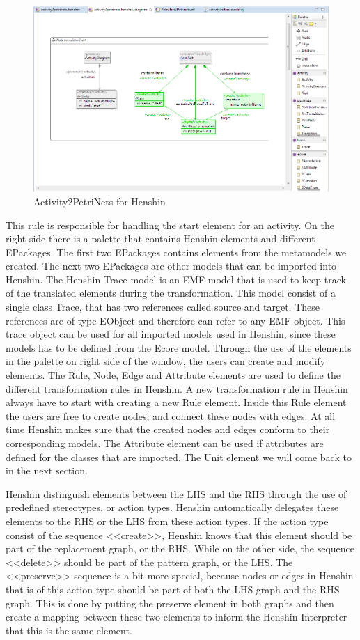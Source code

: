 \documentclass[pdftex,11pt,a4paper]{article}
\begin{document}
\begin{figure}[H]
	\centering
	\includegraphics[scale=0.5]{figures/Henshin_Screen.png}
	\caption{Activity2PetriNets for Henshin}
	\label{fig:HenshinScreen}
\end{figure}

This rule is responsible for handling the start element for an activity.
On the right side there is a palette that contains Henshin elements and
different EPackages. The first two EPackages contains elements from the
metamodels we created. The next two EPackages are other models that can
be imported into Henshin. The Henshin Trace model is an EMF model that is used
to keep track of the translated elements during the transformation. This model
consist of a single class Trace, that has two references called source and
target. These references are of type EObject and therefore can refer to any EMF
object. This trace object can be used for all imported models used
in Henshin, since these models has to be defined from the Ecore model. Through
the use of the elements in the palette on right side of the window, the users
can create and modify elements. 
The Rule, Node, Edge and Attribute elements are used to define the different
transformation rules in Henshin. A new transformation rule in Henshin always
have to start with creating a new Rule element. Inside this Rule element the
users are free to create nodes, and connect these nodes with edges. At
all time Henshin makes sure that the created nodes and edges conform to their
corresponding models. The Attribute element can be used if attributes are
defined for the classes that are imported. The Unit element we will come back to
in the next section.

\indent Henshin distinguish elements between the LHS and the RHS through the
use of predefined stereotypes, or action types. Henshin automatically delegates
these elements to the RHS or the LHS from these action types. If the action type
consist of the sequence <<create>>, Henshin knows that this element should be
part of the replacement graph, or the RHS. While on the other side, the sequence
<<delete>> should be part of the pattern graph, or the LHS. The <<preserve>>
sequence is a bit more special, because nodes or edges in Henshin that is of
this action type should be part of both the LHS graph and the RHS graph. This is
done by putting the preserve element in both graphs and then create a mapping
between these two elements to inform the Henshin Interpreter that this is the
same element.
\end{document}
